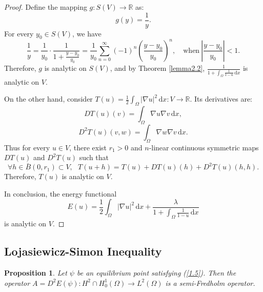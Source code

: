 \documentclass{article}
\numberwithin{equation}{section}
\newtheorem{proposition}[theorem]{Proposition}
\begin{document}
\begin{proof}
    Define the mapping $g:S(V)\to \mathbb{R}$ as:
    $$g(y)=\frac{1}{y}.$$
    For every $y_0\in S(V)$, we have
    $$\frac{1}{y}=\frac{1}{y_0}\cdot \frac{1}{1+\frac{y-y_0}{y_0}}=\frac{1}{y_0}\sum_{n=0}^{\infty}(-1)^n \left(\frac{y-y_0}{y_0}\right)^n,\quad\text{when}\ \left|\frac{y-y_0}{y_0}\right|<1.$$
    Therefore, $g$ is analytic on $S(V)$, and by Theorem \ref{lemma2.2}, $\frac{1}{1+\int_{\Omega}\frac{1}{1-u}\,\mathrm{d}x}$ is analytic on $V$.

    On the other hand, consider $T(u)=\frac{1}{2}\int_{\Omega}|\nabla u|^2\,\mathrm{d}x:V\to\mathbb{R}$. Its derivatives are:
    $$DT(u)(v)=\int_{\Omega}\nabla u\nabla v\,\mathrm{d}x,$$
    $$D^2T(u)(v,w)=\int_{\Omega}\nabla w\nabla v\,\mathrm{d}x.$$
    Thus for every $u\in V$, there exist $r_1>0$ and $n$-linear continuous symmetric maps $DT(u)$ and $D^2T(u)$ such that
    $$\forall h\in\bar{B}(0,r_1)\subset V,\ \ \ T(u+h)=T(u)+DT(u)(h)+D^2T(u)(h,h).$$
    Therefore, $T(u)$ is analytic on $V$.

    In conclusion, the energy functional
    $$E(u)=\frac{1}{2}\int_{\Omega}|\nabla u|^2\,\mathrm{d}x+\frac{\lambda}{1+\int_{\Omega}\frac{1}{1-u}\,\mathrm{d}x}$$
    is analytic on $V$.
\end{proof}

\subsection{Lojasiewicz-Simon Inequality}

\begin{proposition}\label{proposition2.3}
    Let $\psi$ be an equilibrium point satisfying (\ref{1.5}). Then the operator $A=D^2E(\psi):H^2\cap H_0^1(\Omega)\to L^{2}(\Omega)$ is a semi-Fredholm operator.
\end{proposition}
\end{document}
